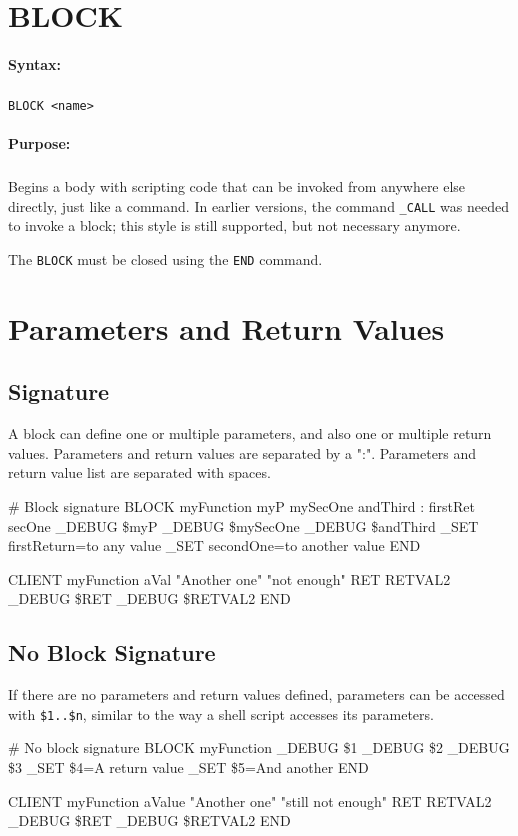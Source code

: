 
\newpage
\section{BLOCK}
\label{cmd:BLOCK}

\paragraph{Syntax:}
\subparagraph{}
\texttt{BLOCK <name>} 

\paragraph{Purpose:}
\subparagraph{}
Begins a body with scripting code that can be invoked from anywhere 
else directly, just like a command. In earlier versions, the command \texttt{\_CALL} was
needed to invoke a block; this style is still supported, but not 
necessary anymore.

The \texttt{BLOCK} must be closed using the \texttt{END} command.

\section{Parameters and Return Values}
\subsection{Signature}
A block can define one or multiple parameters, and also one or multiple return values. 
Parameters and return values are separated by a ":". Parameters and return value list are separated with spaces.
\begin{usplisting}
    # Block signature
    BLOCK myFunction myP mySecOne andThird : firstRet secOne
      _DEBUG \$myP
      _DEBUG \$mySecOne
      _DEBUG \$andThird
      _SET firstReturn=to any value
      _SET secondOne=to another value
    END 

    CLIENT
      myFunction aVal "Another one" "not enough" RET RETVAL2
      _DEBUG \$RET
      _DEBUG \$RETVAL2
    END
\end{usplisting}

\pagebreak 
\subsection{No Block Signature}
If there are no parameters and return values defined, parameters can be 
accessed with \texttt{\$1..\$n}, similar to the way a shell script 
accesses its parameters.
\begin{usplisting}
    # No block signature
    BLOCK myFunction
      _DEBUG \$1
      _DEBUG \$2
      _DEBUG \$3
      _SET \$4=A return value
      _SET \$5=And another
    END

    CLIENT
      myFunction aValue "Another one" "still not enough" RET RETVAL2
      _DEBUG \$RET
      _DEBUG \$RETVAL2
    END
\end{usplisting}

